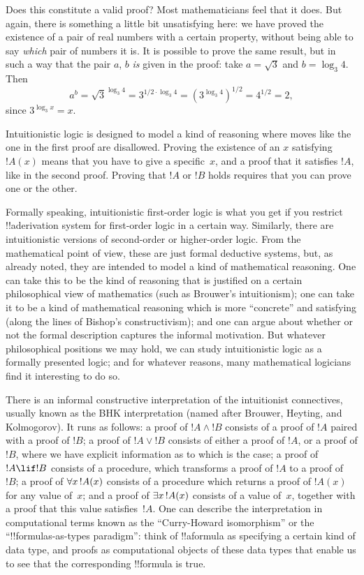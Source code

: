 \documentclass[../../../include/open-logic-section]{subfiles}
\begin{document}
Does this constitute a valid proof? Most mathematicians feel that it
does. But again, there is something a little bit unsatisfying here: we
have proved the existence of a pair of real numbers with a certain
property, without being able to say \emph{which} pair of numbers it
is.  It is possible to prove the same result, but in such a way that
the pair $a$, $b$ \emph{is} given in the proof: take $a = \sqrt{3}$
and $b = \log_3 4$. Then
\[
a^b = \sqrt{3}^{\log_3 4} = 3^{1/2 \cdot \log_3 4} = (3^{\log_3
  4})^{1/2} = 4^{1/2}= 2,
\]
since $3^{\log_3 x} = x$.

Intuitionistic logic is designed to model a kind of reasoning where
moves like the one in the first proof are disallowed. Proving the
existence of an $x$ satisfying~$!A(x)$ means that you have to give a
specific~$x$, and a proof that it satisfies $!A$, like in the second
proof. Proving that $!A$ or $!B$ holds requires that you can prove one
or the other.

Formally speaking, intuitionistic first-order logic is what you get if
you restrict !!a{derivation} system for first-order logic in a certain
way. Similarly, there are intuitionistic versions of second-order or
higher-order logic. From the mathematical point of view, these are
just formal deductive systems, but, as already noted, they are
intended to model a kind of mathematical reasoning. One can take this
to be the kind of reasoning that is justified on a certain
philosophical view of mathematics (such as Brouwer's intuitionism);
one can take it to be a kind of mathematical reasoning which is more
``concrete'' and satisfying (along the lines of Bishop's
constructivism); and one can argue about whether or not the formal
description captures the informal motivation. But whatever
philosophical positions we may hold, we can study intuitionistic logic
as a formally presented logic; and for whatever reasons, many
mathematical logicians find it interesting to do so.

There is an informal constructive interpretation of the intuitionist
connectives, usually known as the BHK interpretation (named after
Brouwer, Heyting, and Kolmogorov). It runs as follows: a proof of $!A
\land !B$ consists of a proof of $!A$ paired with a proof of $!B$; a
proof of $!A \lor !B$ consists of either a proof of $!A$, or a proof
of $!B$, where we have explicit information as to which is the case; a
proof of $!A \lif !B$ consists of a procedure, which transforms a
proof of $!A$ to a proof of~$!B$; a proof of $\lforall[x][!A(x)]$
consists of a procedure which returns a proof of $!A(x)$ for any value
of~$x$; and a proof of $\lexists[x][!A(x)]$ consists of a value
of~$x$, together with a proof that this value satisfies~$!A$. One can
describe the interpretation in computational terms known as the
``Curry-Howard isomorphism'' or the ``!!{formula}s-as-types
paradigm'': think of !!a{formula} as specifying a certain kind of
data type, and proofs as computational objects of these data types
that enable us to see that the corresponding !!{formula} is true.
\end{document}
